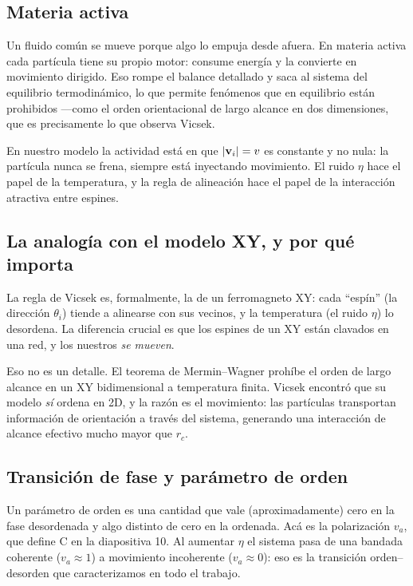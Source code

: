 \documentclass[11pt]{article}
\begin{document}
\subsection{Materia activa}

Un fluido común se mueve porque algo lo empuja desde afuera. En materia activa
cada partícula tiene su propio motor: consume energía y la convierte en
movimiento dirigido. Eso rompe el balance detallado y saca al sistema del
equilibrio termodinámico, lo que permite fenómenos que en equilibrio están
prohibidos ---como el orden orientacional de largo alcance en dos dimensiones,
que es precisamente lo que observa Vicsek.

En nuestro modelo la actividad está en que $|\mathbf{v}_i| = v$ es constante y no
nula: la partícula nunca se frena, siempre está inyectando movimiento. El ruido
$\eta$ hace el papel de la temperatura, y la regla de alineación hace el papel
de la interacción atractiva entre espines.

\subsection{La analogía con el modelo XY, y por qué importa}

La regla de Vicsek es, formalmente, la de un ferromagneto XY: cada ``espín''
(la dirección $\theta_i$) tiende a alinearse con sus vecinos, y la temperatura
(el ruido $\eta$) lo desordena. La diferencia crucial es que los espines de un
XY están clavados en una red, y los nuestros \emph{se mueven}.

Eso no es un detalle. El teorema de Mermin--Wagner prohíbe el orden de largo
alcance en un XY bidimensional a temperatura finita. Vicsek encontró que su
modelo \emph{sí} ordena en 2D, y la razón es el movimiento: las partículas
transportan información de orientación a través del sistema, generando una
interacción de alcance efectivo mucho mayor que $r_c$.


\subsection{Transición de fase y parámetro de orden}

Un parámetro de orden es una cantidad que vale (aproximadamente) cero en la fase
desordenada y algo distinto de cero en la ordenada. Acá es la polarización
$v_a$, que define C en la diapositiva 10. Al aumentar $\eta$ el sistema pasa de
una bandada coherente ($v_a \approx 1$) a movimiento incoherente
($v_a \approx 0$): eso es la transición orden--desorden que caracterizamos en
todo el trabajo.
\end{document}
